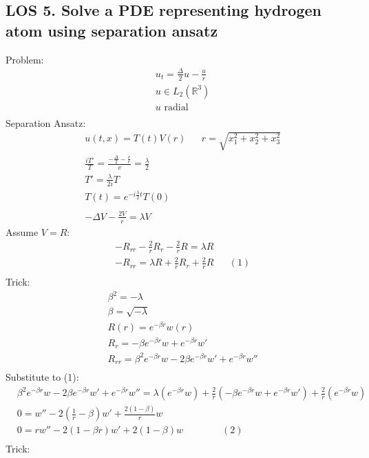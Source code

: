 \documentclass[12pt, a4paper]{article}
\begin{document}
\subsection*{LOS 5. Solve a PDE representing hydrogen atom using separation ansatz}
Problem:
\begin{align*}
    &u_t = \frac{\Delta}{2}u - \frac{u}{r}\\
    &u \in L_2(\mathbb{R}^3)\\
    &u \text{ radial}\\
\end{align*}
Separation Ansatz:
\begin{align*}
    &u(t, x) = T(t)V(r)&&r = \sqrt{x_1^2+x_2^2+x_3^2}\\
    &\frac{iT'}{T} = \frac{-\frac{\Delta}{2} - \frac{v}{r}}{v} = \frac{\lambda}{2}\\
    &T' = \frac{\lambda}{2i}T\\
    &T(t) = e^{-i\frac{\lambda}{2}t}T(0)\\\\
    &-\Delta V - \frac{2V}{r} = \lambda V
\end{align*}
Assume $V =  R$:
\begin{align*}
    &-R_{rr} - \frac{2}{r}R_r - \frac{2}{r}R = \lambda R\\
    &-R_{rr} = \lambda R+ \frac{2}{r}R_r + \frac{2}{r}R&&(1)\\
\end{align*}
Trick:
\begin{align*}
    &\beta^2 = -\lambda\\
    &\beta= \sqrt{-\lambda}\\
    &R(r) = e^{-\beta r }w(r)\\
    &R_r = -\beta e^{-\beta r} w+e^{-\beta r }w'\\
    &R_{rr} = \beta^2 e^{-\beta r} w-2\beta e^{-\beta r }w'+e^{-\beta r }w''\\
\end{align*}
Substitute to (1):
\begin{align*}
    &\beta^2 e^{-\beta r} w-2\beta e^{-\beta r }w'+e^{-\beta r }w'' = \lambda(e^{-\beta r }w) + \frac{2}{r}(-\beta e^{-\beta r} w+e^{-\beta r }w') + \frac{2}{r}(e^{-\beta r }w)\\
    &0 = w'' - 2\left(\frac{1}{r}-\beta\right)w' + \frac{2(1-\beta)}{r}w\\
    &0 = rw'' - 2(1-\beta r)w' + 2(1-\beta)w \qquad\qquad (2)\\
\end{align*}
Trick:
\end{document}
